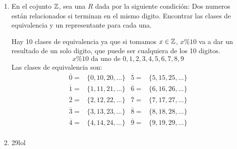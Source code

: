 \documentclass[../practica.root.tex]{subfiles}
\begin{document}
\begin{enumerate}
    \item En el cojunto $\mathbb{Z}$, sea una $R$ dada por la siguiente condición: Dos numeros están relacionados si terminan en el mismo digito.
          Encontrar las clases de equivalencia y un representante para cada una.

          Hay 10 clases de equivalencia ya que si tomamos $x \in \mathbb{Z}$, $x \% 10$
          va a dar un resultado de un solo digito, que puede ser cualquiera de los 10 digitos.
          \[ x \% 10 \text{ da uno de } 0, 1, 2, 3, 4, 5, 6, 7, 8, 9 \]
          Las clases de equivalencia son:
          \begin{align*}
              \overline{0} = & \{0, 10, 20, \dots\} & \overline{5} = & \{5, 15, 25, \dots\} \\
              \overline{1} = & \{1, 11, 21, \dots\} & \overline{6} = & \{6, 16, 26, \dots\} \\
              \overline{2} = & \{2, 12, 22, \dots\} & \overline{7} = & \{7, 17, 27, \dots\} \\
              \overline{3} = & \{3, 13, 23, \dots\} & \overline{8} = & \{8, 18, 28, \dots\} \\
              \overline{4} = & \{4, 14, 24, \dots\} & \overline{9} = & \{9, 19, 29, \dots\} \\
          \end{align*}

    \item 29lol

\end{enumerate}
\end{document}
